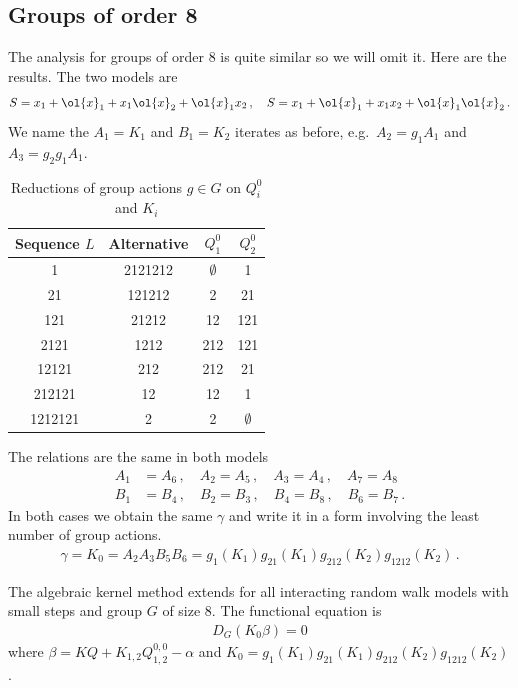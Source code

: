 \subsection{Groups of order 8}
The analysis for groups of order 8 is quite similar so we will omit it. Here are the results. 
The two models are
\begin{align}
	S = x_1+\ol{x}_1+x_1\ol{x}_2+\ol{x}_1x_2\,,\quad S  = x_1+\ol{x}_1+x_1x_2+\ol{x}_1\ol{x}_2\,.
\end{align}
We name the $A_1 = K_1$ and $B_1 = K_2$ iterates as before, e.g.\ $A_2 = g_1 A_1$ and $A_3 = g_2 g_1 A_1$.
\begin{table}[H]
\caption{Reductions of group actions $g \in G$ on $Q_i^0$ and $K_i$}
\label{tbl:tableG6}
\centering
\begin{tabular}{cccc}
\toprule
	Sequence $L$ & Alternative & $Q_1^0$ & $Q_2^0$ \\ 
\midrule
	1 & 2121212 & $\emptyset$ & 1 \\
	21 &  121212& 2 & 21   \\
	121 & 21212 & 12 & 121  \\
	2121 & 1212 &  212 & 121  \\
	12121 & 212 &  212 & 21  \\
	212121 & 12 &  12& 1  \\
	1212121 & 2 &  2& $\emptyset$ \\
\bottomrule
\end{tabular}
\end{table}
The relations are the same in both models
\begin{align}
	A_1 &= A_6\,,\quad A_2 = A_5\,,\quad A_3 = A_4\,,\quad A_7 = A_8\,\\
	B_1 &= B_4\,, \quad B_2 = B_3\,,\quad B_4 = B_8\,,\quad B_6 = B_7\,.
\end{align}
In both cases we obtain the same $\gamma$ and write it in a form involving the least number of group actions.
\begin{align}
	\gamma = K_0 =  A_2 A_3 B_5 B_6 = g_1(K_1) g_{21}(K_1) g_{212}(K_2) g_{1212}(K_2)\,.
\end{align}
\begin{theorem} The algebraic kernel method extends for all interacting random walk models with small steps and group $G$ of size 8. The functional equation is
\begin{align}
	D_G(K_0 \beta) = 0
\end{align}
where $\beta =  KQ + K_{1,2}Q_{1,2}^{0,0} -\alpha$ and $K_0 = g_1(K_1) g_{21}(K_1) g_{212}(K_2) g_{1212}(K_2)$.
\end{theorem}

